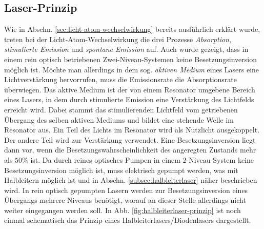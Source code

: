\subsection{Laser-Prinzip}\label{subsec:laser-prinzip}
Wie in Abschn. \ref{sec:licht-atom-wechselwirkung} bereits ausführlich erklärt
wurde, treten bei der Licht-Atom-Wechselwirkung die drei Prozesse
\textit{Absorption}, \textit{stimulierte Emission} und \textit{spontane Emission} auf. Auch wurde
gezeigt, dass in einem rein optisch betriebenen Zwei-Niveau-Systemen keine
Besetzungsinversion möglich ist.
Möchte man allerdings in dem sog. \textit{aktiven Medium} eines Lasers eine Lichtverstärkung
hervorrufen, muss die Emissionsrate die Absorptionsrate überwiegen. Das aktive Medium ist der von einem Resonator
umgebene Bereich eines Lasers, in dem durch stimulierte Emission eine
Verstärkung des Lichtfelds erreicht wird. Dabei stammt das stimulierenden
Lichtfeld vom getriebenen Übergang des selben aktiven Mediums und bildet eine
stehende Welle im Resonator aus. Ein Teil des Lichts im Resonator wird als
Nutzlicht ausgekoppelt. Der andere Teil wird zur Verstärkung verwendet. Eine
Besetzungsinversion liegt dann vor, wenn die Besetzungswahrscheinlichkeit des
angeregten Zustands mehr als $50\%$ ist.
Da durch reines optisches Pumpen in einem
2-Niveau-System keine Besetzungsinversion möglich ist, muss elektrisch gepumpt
werden, was mit Halbleitern möglich ist und in Abschn.
\ref{subsec:halbleiterlaser} näher beschrieben wird. In rein optisch gepumpten
Lasern werden zur Besetzungsinversion eines Übergangs mehrere Niveaus benötigt,
worauf an dieser Stelle allerdings nicht weiter eingegangen werden soll. In Abb.
\ref{fig:halbleiterlaser-prinzip} ist noch einmal schematisch das Prinzip eines Halbleiterlasers/Diodenlasers dargestellt.
